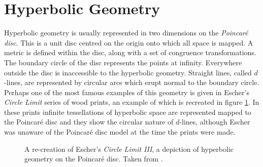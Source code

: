 
\section{Hyperbolic Geometry}

Hyperbolic geometry is usually represented in two dimensions on the
\emph{Poincar\'e disc}. This is a unit disc centred on the origin
onto which all space is mapped. A metric is defined within the
disc\cite{brannan}, along with a set of congruence transformations.
The boundary circle of the disc represents the points at infinity. Everywhere
outside the disc is inaccessible to the hyperbolic geometry. Straight lines,
called $d$-lines\cite{brannan}, are represented by circular arcs which
erupt normal to the boundary circle. Perhaps one of the most famous examples of this
geometry is given in Escher's \emph{Circle Limit} series of wood prints, an example of
which is recreated in figure \ref{fig:circlelimit}. In these prints infinite
tessellations of hyperbolic space are represented mapped to the Poincar\'e
disc and they show the circular nature of $d$-lines, although Escher was
unaware of the Poincar\'e disc model at the time the prints were made.

\begin{figure} \centering
{}
\caption{A re-creation of Escher's \emph{Circle Limit III}, 
a depiction of hyperbolic geometry on the Poincar\'e disc.
Taken from \cite{transhyp}.}
\label{fig:circlelimit}
\end{figure}

